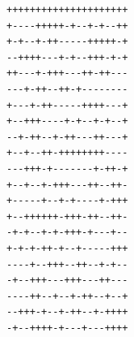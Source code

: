 \begin{BVerbatim}
+++++++++++++++++++++
+----+++++-+--+-+--++
+-+--+-++-----+++++-+
--++++---+-+--+++-+-+
++---+-+++---++-++---
---+-++--++-+--------
+---+-++-----++++---+
+--+++----+-+--+-+--+
--+-++--+-++---++---+
+--+--++-++++++++----
---+++-+-------+-++-+
+--+--+-+++---++--++-
+-----+--+-+----+-+++
+--++++++-+++-++--++-
-+-+--+-+-+++-+---+--
+-+-+-++-+--+-----+++
----+--+++--++--+-+--
-+--+++---+++---++---
----++--+--+-++--+--+
--+++-+--+-++--+-++++
-+--++++-+---+---++++
\end{BVerbatim}
